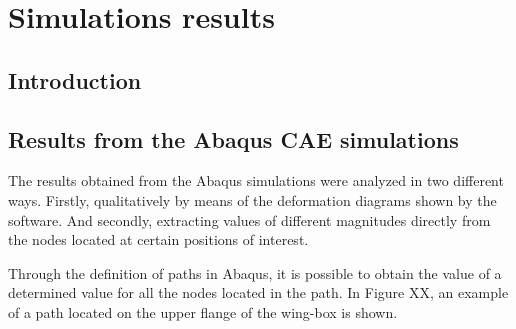 \chapter{Simulations results} \label{chap:Results_sim}

\section{Introduction} \label{sec:intro_Results_sim}


\section{Results from the Abaqus CAE simulations} \label{sec:computationalParametricStudy_Results}

The results obtained from the Abaqus simulations were analyzed in two different ways. Firstly, qualitatively by means of the deformation diagrams shown by the software. And secondly, extracting values of different magnitudes directly from the nodes located at certain positions of interest.

Through the definition of paths in Abaqus, it is possible to obtain the value of a determined value for all the nodes located in the path. In Figure XX, an example of a path located on the upper flange of the wing-box is shown.


%
%


